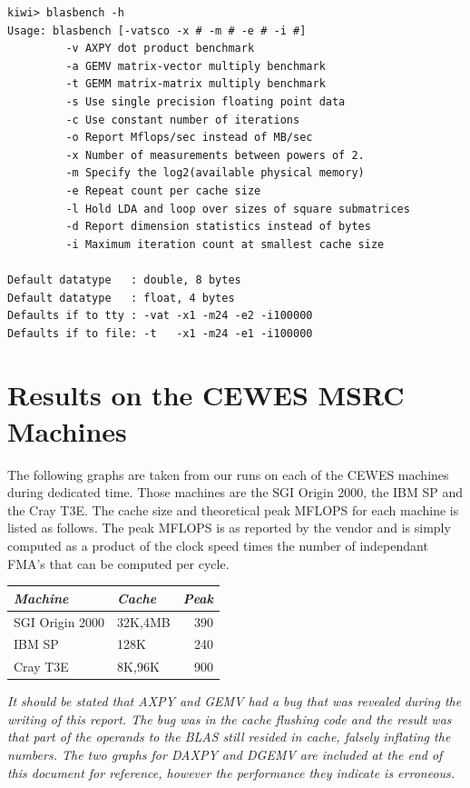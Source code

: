 \documentclass [12pt]{article}
\begin{document}
\begin{verbatim}
kiwi> blasbench -h
Usage: blasbench [-vatsco -x # -m # -e # -i #]
         -v AXPY dot product benchmark
         -a GEMV matrix-vector multiply benchmark
         -t GEMM matrix-matrix multiply benchmark
         -s Use single precision floating point data
         -c Use constant number of iterations
         -o Report Mflops/sec instead of MB/sec
         -x Number of measurements between powers of 2.
         -m Specify the log2(available physical memory)
         -e Repeat count per cache size
         -l Hold LDA and loop over sizes of square submatrices
         -d Report dimension statistics instead of bytes
         -i Maximum iteration count at smallest cache size

Default datatype   : double, 8 bytes
Default datatype   : float, 4 bytes
Defaults if to tty : -vat -x1 -m24 -e2 -i100000
Defaults if to file: -t   -x1 -m24 -e1 -i100000
\end{verbatim}

\section{Results on the CEWES MSRC Machines}

The following graphs are taken from our runs on each of the CEWES
machines during dedicated time. Those machines are the SGI Origin
2000, the IBM SP and the Cray T3E. The cache size and theoretical 
peak MFLOPS for each machine is listed as follows. The peak MFLOPS
is as reported by the vendor and is simply computed as a product of 
the clock speed times the number of independant FMA's that can be
computed per cycle.

\begin{center}
\begin{tabular}{|l|l|r|} \hline
{\em Machine} & {\em Cache } & {\em Peak}\\ \hline
SGI Origin 2000 & 32K,4MB & 390 \\ \hline
IBM SP & 128K & 240 \\ \hline
Cray T3E & 8K,96K & 900 \\ \hline
\end{tabular}
\end{center}

{\em It should be stated that AXPY and GEMV had a bug that was revealed
during the writing of this report. The bug was in the cache flushing
code and the result was that part of the operands to the BLAS still resided
in cache, falsely inflating the numbers. The two graphs for DAXPY and DGEMV
are included at the end of this document for reference, however the performance they indicate is erroneous.}
\end{document}
